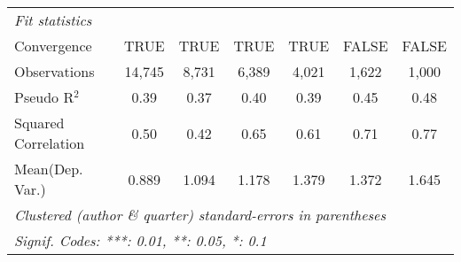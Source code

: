 \begin{tabular}{lcccccc}
   \midrule
   \emph{Fit statistics}\\
   Convergence                                                &TRUE          & TRUE         & TRUE         & TRUE         & FALSE        & FALSE\\  
   Observations                                               & 14,745       & 8,731        & 6,389        & 4,021        & 1,622        & 1,000\\  
   Pseudo R$^2$                                               & 0.39         & 0.37         & 0.40         & 0.39         & 0.45         & 0.48\\  
   Squared Correlation                                        & 0.50         & 0.42         & 0.65         & 0.61         & 0.71         & 0.77\\  
Mean(Dep. Var.) & 0.889 & 1.094 & 1.178 & 1.379 & 1.372 & 1.645 \\
   \midrule \midrule
   \multicolumn{7}{l}{\emph{Clustered (author \& quarter) standard-errors in parentheses}}\\
   \multicolumn{7}{l}{\emph{Signif. Codes: ***: 0.01, **: 0.05, *: 0.1}}\\
\end{tabular}
\par\endgroup
